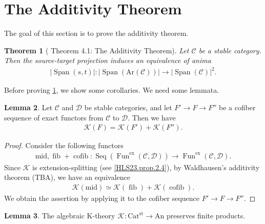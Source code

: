 \documentclass[a4paper,dvipdfmx,11pt,reqno]{amsart}
\DeclareMathOperator{\fib}{fib}
\DeclareMathOperator{\cofib}{cofib}
\renewcommand{\mid}{\mathrm{mid}}
\DeclareMathOperator{\Fun}{Fun}
\newcommand{\C}{\mathcal{C}}
\newcommand{\D}{\mathcal{D}}
\newcommand{\K}{\mathcal{K}}
\DeclareMathOperator{\Seq}{Seq}
\DeclareMathOperator{\Span}{Span}
\newcommand{\An}{\mathrm{An}}
\newcommand{\Catst}{\mathrm{Cat^{st}}}
\newcommand{\Ar}{\mathrm{Ar}}
\newtheorem{theorem}{Theorem}[section]
\theoremstyle{definition}
\newtheorem{lemma}[theorem]{Lemma}
\begin{document}
\section{The Additivity Theorem}

The goal of this section is to prove the additivity theorem.

\begin{theorem}[\cite{HLS23} Theorem 4.1: The Additivity Theorem] \label{thrm.additivity_theorem}
  Let $\C$ be a stable category.
  Then the source-target projection induces an equivalence of anima 
  \begin{align*}
    |\Span(s,t)| : |\Span(\Ar(\C))| \to |\Span(\C)|^2.
  \end{align*}
\end{theorem}

Before proving \cref{thrm.additivity_theorem}, we show some corollaries.
We need some lemmata.

\begin{lemma} \label{Ber.cor.5.7}
  Let $\C$ and $\D$ be stable categories, and let $F' \to F \to F''$ be a cofiber sequence of exact functors from $\C$ to $\D$.
  Then we have 
  \begin{align*}
    \K(F) 
    = \K(F') + \K(F'').
  \end{align*}
\end{lemma}

\begin{proof}
  Consider the following functors 
  \begin{align*}
    \mid, \fib+\cofib : \Seq(\Fun^{\mathrm{ex}}(\C,\D)) \to \Fun^{\mathrm{ex}}(\C,\D).
  \end{align*}
  Since $\K$ is extension-splitting (see \cref{HLS23.prop.2.4}), by Waldhausen's additivity theorem (TBA), we have an equivalence %
  \begin{align*}
    \K(\mid) 
    \simeq \K(\fib) + \K(\cofib).
  \end{align*}
  We obtain the assertion by applying it to the cofiber sequence $F' \to F \to F''$.
\end{proof}

\begin{lemma} \label{Ber.5.2.2}
  The algebraic K-theory $\K : \Catst \to \An$ preserves finite products.
\end{lemma}
\end{document}
